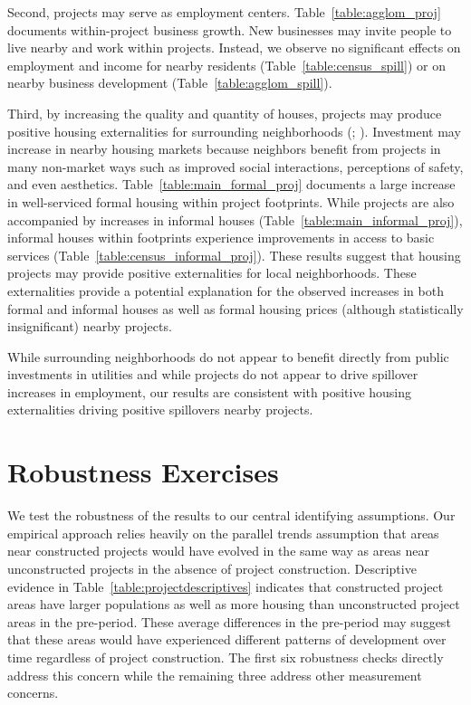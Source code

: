 \documentclass[12pt]{article}
\newcommand{\rv}{}
\begin{document}
\rv{Second, projects may serve as employment centers.  Table~\ref{table:agglom_proj} documents within-project business growth.  New businesses may invite people to live nearby and work within projects.  Instead, we observe no significant effects on employment and income for nearby residents (Table~\ref{table:census_spill}) or on nearby business development (Table~\ref{table:agglom_spill}).  }

\rv{Third, by increasing the quality and quantity of houses, projects may produce positive housing externalities for surrounding neighborhoods (\cite{rossi2010housing}; \cite{diamond2019wants}).  Investment may increase in nearby housing markets because neighbors benefit from projects in many non-market ways such as improved social interactions, perceptions of safety, and even aesthetics.  Table~\ref{table:main_formal_proj} documents a large increase in well-serviced formal housing within project footprints.  While projects are also accompanied by increases in informal houses (Table~\ref{table:main_informal_proj}), informal houses within footprints experience improvements in access to basic services (Table~\ref{table:census_informal_proj}).  These results suggest that housing projects may provide positive externalities for local neighborhoods.  These externalities provide a potential explanation for the observed increases in both formal and informal houses as well as formal housing prices (although statistically insignificant) nearby projects.}

\rv{While surrounding neighborhoods do not appear to benefit directly from public investments in utilities and while projects do not appear to drive spillover increases in employment, our results are consistent with positive housing externalities driving positive spillovers nearby projects.}

\section{Robustness Exercises}\label{section:robustness}

We test the robustness of the results to our central identifying assumptions.  Our empirical approach relies heavily on the parallel trends assumption that areas near constructed projects would have evolved in the same way as areas near unconstructed projects in the absence of project construction.  Descriptive evidence in Table~\ref{table:projectdescriptives} indicates that constructed project areas have larger populations as well as more housing than unconstructed project areas in the pre-period.  These average differences in the pre-period may suggest that these areas would have experienced different patterns of development over time regardless of project construction.  \rv{The first six robustness checks directly address this concern while the remaining three address other measurement concerns.}
\end{document}
